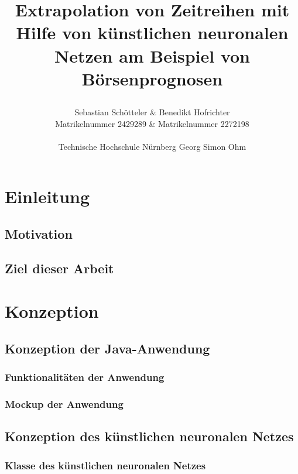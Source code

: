 \documentclass[11pt,a4paper]{scrreprt}
\begin{document}
\title
{
\bf Extrapolation von Zeitreihen mit Hilfe von künstlichen neuronalen Netzen am Beispiel von Börsenprognosen
\author
{
	Sebastian Schötteler \& Benedikt Hofrichter \\
	Matrikelnummer 2429289 \& Matrikelnummer 2272198 \\\\ 
	Technische Hochschule Nürnberg Georg Simon Ohm \\
}
}

\maketitle


\tableofcontents

\chapter{Einleitung}
 \section{Motivation}
 \section{Ziel dieser Arbeit}

\chapter{Konzeption}
	\section{Konzeption der Java-Anwendung}
		\subsection{Funktionalitäten der Anwendung}
		\subsection{Mockup der Anwendung}
	\section{Konzeption des künstlichen neuronalen Netzes}
		\subsection{Klasse des künstlichen neuronalen Netzes}
\end{document}
